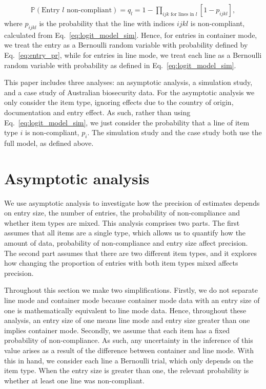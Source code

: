 \documentclass[aoas]{imsart}
\begin{document}
\begin{align}
\mathbb{P}\left(\text{Entry } l \text{ non-compliant}\right) = q_l = 1-\prod_{ijk \text{ for lines in }l}[1-p_{ijkl}],\label{eq:entry_pr}
\end{align}
where  {$p_{ijkl}$ is the probability that the line with indices $ijkl$} is non-compliant, calculated from Eq.~\eqref{eq:logit_model_sim}.
Hence, for entries in container mode, we treat the entry  as a Bernoulli random variable with probability defined by Eq.~\eqref{eq:entry_pr}, while for entries in line mode, we treat each line as a Bernoulli random variable with probability as defined in Eq.~\eqref{eq:logit_model_sim}.


This paper includes three analyses: an asymptotic analysis,
 a simulation study, and a case study of Australian biosecurity data.  {For the asymptotic analysis we only consider the item type, ignoring effects due to the country of origin, documentation and entry effect. As such,} rather than using Eq.~\eqref{eq:logit_model_sim}, we just consider the probability that a line of item type \(i\) is non-compliant, \(p_i\). The simulation study and the case study both use the full model, as defined above. 

\section{Asymptotic analysis}\label{sec:asymptotic_analysis}
We use asymptotic analysis to investigate how the precision of estimates depends on entry size, the number of entries, the probability of non-compliance and whether item types are mixed. This analysis comprises two parts. The first assumes that all items are a single type, which allows us to quantify how the amount of data, probability of non-compliance  and entry size affect precision. The second part assumes that there are two different item types, and it explores how changing the proportion of entries with both item types mixed affects precision.

Throughout this section we make two simplifications. Firstly, we do not separate line mode and container mode because container mode data with an entry size of one is mathematically equivalent to line mode data. Hence, throughout these analysis, an entry size of one means line mode and entry size greater than one implies container mode. Secondly, we  assume that each item has a fixed probability of non-compliance.  {As such, any uncertainty in the inference of this value arises as a result of the difference between container and line mode. With this in hand,} we consider each line a Bernoulli trial, which only depends on the item type. When the entry size is greater than one, the relevant probability is whether at least one line was  {non-compliant.}
\end{document}

